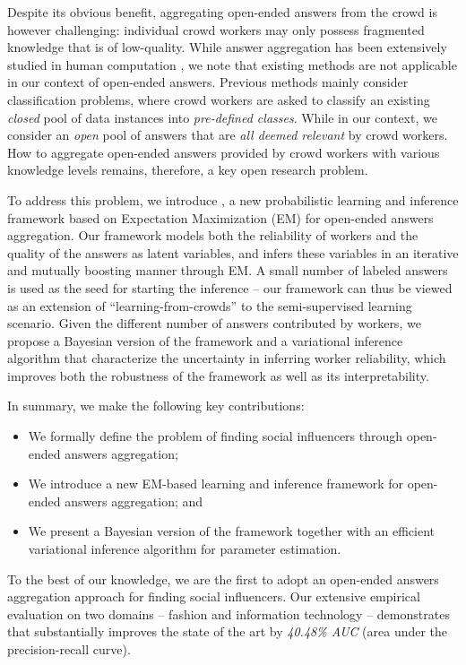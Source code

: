 Despite its obvious benefit, aggregating open-ended answers from the crowd is however challenging: individual crowd workers may only possess fragmented knowledge that is of low-quality. While answer aggregation has been extensively studied in human computation \cite{dawid1979maximum,whitehill2009whose,ZhengLLSC17}, we note that existing methods are not applicable in our context of open-ended answers. Previous methods mainly consider classification problems, where crowd workers are asked to classify an existing \emph{closed} pool of data instances into \emph{pre-defined classes}. While in our context, we consider an \emph{open} pool of answers that are \emph{all deemed relevant} by crowd workers. How to aggregate open-ended answers provided by crowd workers with various knowledge levels remains, therefore, a key open research problem.

To address this problem, we introduce \sys, a new probabilistic learning and inference framework based on Expectation Maximization (EM) for open-ended answers aggregation. Our framework models both the reliability of workers and the quality of the answers as latent variables, and infers these variables in an iterative and mutually boosting manner through EM. A small number of labeled answers is used as the seed for starting the inference -- our framework can thus be viewed as an extension of ``learning-from-crowds''  \cite{raykar2010learning,tian2012learning,yang2018leveraging} to the semi-supervised learning scenario. Given the different number of answers contributed by workers, we propose a Bayesian version of the framework and a variational inference algorithm that characterize the uncertainty in inferring worker reliability, which improves both the robustness of the framework as well as its interpretability. 

In summary, we make the following key contributions:
\begin{itemize}
\item We formally define the problem of finding social influencers through open-ended answers aggregation;
\item We introduce a new EM-based learning and inference framework for open-ended answers aggregation; and
\item We present a Bayesian version of the framework together with an efficient variational inference algorithm for parameter estimation. 
\end{itemize}

To the best of our knowledge, we are the first to adopt an open-ended answers aggregation approach for finding social influencers. Our extensive empirical evaluation on two domains -- fashion and information technology -- demonstrates that \sys substantially improves the state of the art by \emph{40.48\% AUC} (area under the precision-recall curve).

